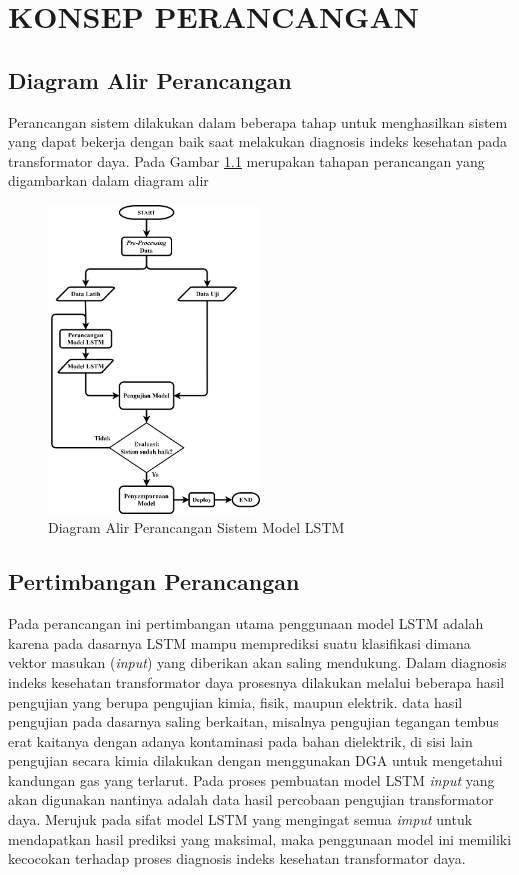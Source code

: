 \chapter{KONSEP PERANCANGAN}
\label{BAB3:Metode}
\section{Diagram Alir Perancangan}
Perancangan sistem dilakukan dalam beberapa tahap untuk menghasilkan sistem 
yang dapat bekerja dengan baik saat melakukan diagnosis indeks kesehatan pada 
transformator daya. Pada Gambar \ref{gambar:diagram alir} merupakan tahapan perancangan yang 
digambarkan dalam diagram alir
\begin{figure}[h]
	\begin{center}
		\includegraphics[width=0.5\textwidth]{BAB-3/figures/diagram alir.png}	
		\caption{Diagram Alir Perancangan Sistem Model LSTM}
		\label{gambar:diagram alir}
	\end{center}
\end{figure}

\section{Pertimbangan Perancangan}
Pada perancangan ini pertimbangan utama penggunaan model LSTM adalah karena pada dasarnya LSTM mampu memprediksi suatu klasifikasi dimana vektor masukan (\textit{input}) yang diberikan akan saling mendukung. Dalam diagnosis indeks kesehatan transformator daya prosesnya dilakukan melalui beberapa hasil pengujian yang berupa pengujian kimia, fisik, maupun elektrik. data hasil pengujian pada dasarnya saling berkaitan, misalnya pengujian tegangan tembus erat kaitanya dengan adanya kontaminasi pada bahan dielektrik, di sisi lain pengujian secara kimia dilakukan dengan menggunakan DGA untuk mengetahui kandungan gas yang terlarut. Pada proses pembuatan model LSTM \textit{input} yang akan digunakan nantinya adalah data hasil percobaan pengujian transformator daya. Merujuk pada sifat model LSTM yang mengingat semua \textit{imput} untuk mendapatkan hasil prediksi yang maksimal, maka penggunaan model ini memiliki kecocokan terhadap proses diagnosis indeks kesehatan transformator daya. \par 


